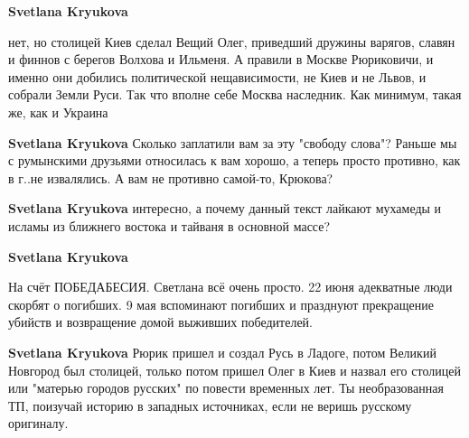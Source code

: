 \begin{itemize}
\begin{itemize}
\textbf{Svetlana Kryukova} 

нет, но столицей Киев сделал Вещий Олег, приведший дружины варягов, славян и
финнов с берегов Волхова и Ильменя. А правили в Москве Рюриковичи, и именно они
добились политической нещависимости, не Киев и не Львов, и собрали Земли Руси.
Так что вполне себе Москва наследник. Как минимум, такая же, как и Украина

 
\textbf{Svetlana Kryukova} Сколько заплатили вам за эту "свободу слова"? Раньше мы с румынскими друзьями относилась к вам хорошо, а теперь просто противно, как в г..не извалялись. А вам не противно самой-то, Крюкова?

 
\textbf{Svetlana Kryukova} интересно, а почему данный текст лайкают мухамеды и исламы из ближнего востока и тайваня в основной массе?

 
\textbf{Svetlana Kryukova} 

На счёт ПОБЕДАБЕСИЯ. Светлана всё очень просто. 22 июня адекватные люди скорбят
о погибших. 9 мая вспоминают погибших и празднуют прекращение убийств и
возвращение домой выживших победителей.

 
\textbf{Svetlana Kryukova} Рюрик пришел и создал Русь в Ладоге, потом Великий Новгород был столицей, только потом пришел Олег в Киев и назвал его столицей или "матерью городов русских" по повести временных лет. Ты необразованная ТП, поизучай историю в западных источниках, если не веришь русскому оригиналу.


\end{itemize}
\end{itemize}
